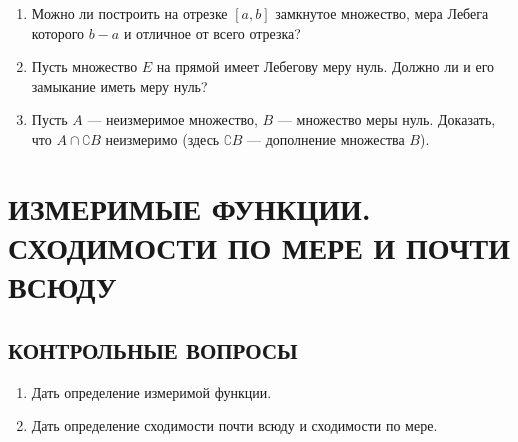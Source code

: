 \documentclass[12pt,a4paper]{article}
\begin{document}
\begin{enumerate}
\item Можно ли построить на отрезке $[a, b]$ замкнутое множество, мера Лебега которого $b-a$ и отличное от всего отрезка?

\item Пусть множество $E$ на прямой имеет Лебегову меру нуль. Должно ли и его замыкание иметь меру нуль?

\item Пусть $A$ — неизмеримое множество, $B$ — множество меры нуль. Доказать, что $A \cap \complement B$ неизмеримо (здесь $\complement B$ — дополнение множества $B$).
\end{enumerate}

\section{ИЗМЕРИМЫЕ ФУНКЦИИ. СХОДИМОСТИ ПО МЕРЕ И ПОЧТИ ВСЮДУ}

\subsection*{КОНТРОЛЬНЫЕ ВОПРОСЫ}
\begin{enumerate}
\item Дать определение измеримой функции.
\item Дать определение сходимости почти всюду и сходимости по мере.
\end{enumerate}
\end{document}
